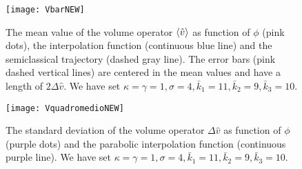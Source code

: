 \documentclass[aps,prd,twocolumn,nofootinbib,superscriptaddress]{revtex4-2}
\begin{document}
\begin{figure}
	\centering
	\texttt{[image: VbarNEW]}
	\caption{The mean value of the volume operator  $\braket{\hat{v}}$ as function of $\phi$ (pink dots), the interpolation function (continuous blue line) and the semiclassical trajectory (dashed gray line). The error bars (pink dashed vertical lines) are centered in the mean values and have a length of $2\Delta\hat{v}$. We have set $\kappa=\gamma=1,\sigma=4,\bar{k}_1=11,\bar{k}_2=9,\bar{k}_3=10$.}
	\label{VbarNEW}
\end{figure}
\begin{figure}
	\centering
	\texttt{[image: VquadromedioNEW]}
	\caption{The standard deviation of the volume operator  $\Delta\hat{v}$ as function of $\phi$ (purple dots) and the parabolic interpolation function (continuous purple line). We have set $\kappa=\gamma=1,\sigma=4,\bar{k}_1=11,\bar{k}_2=9,\bar{k}_3=10$.}
	\label{VquadromedioNEW}
\end{figure}
\end{document}

